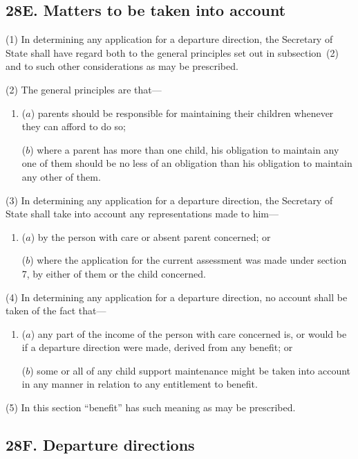\documentclass[12pt,a4paper]{article}
\begin{document}
\subsection{28E. Matters to be taken into account}

(1) In determining any application for a departure direction, the Secretary of State shall have regard both to the general principles set out in subsection~(2) and to such other considerations as may be prescribed.

(2) The general principles are that—
\begin{enumerate}\item[]
($a$) parents should be responsible for maintaining their children whenever they can afford to do so;

($b$) where a parent has more than one child, his obligation to maintain any one of them should be no less of an obligation than his obligation to maintain any other of them.
\end{enumerate}

(3) In determining any application for a departure direction, the Secretary of State shall take into account any representations made to him—
\begin{enumerate}\item[]
($a$) by the person with care or absent parent concerned; or

($b$) where the application for the current assessment was made under section 7, by either of them or the child concerned.
\end{enumerate}

(4) In determining any application for a departure direction, no account shall be taken of the fact that—
\begin{enumerate}\item[]
($a$) any part of the income of the person with care concerned is, or would be if a departure direction were made, derived from any benefit; or

($b$) some or all of any child support maintenance might be taken into account in any manner in relation to any entitlement to benefit.
\end{enumerate}

(5) In this section “benefit” has such meaning as may be prescribed.


\subsection{28F. Departure directions}
\end{document}
